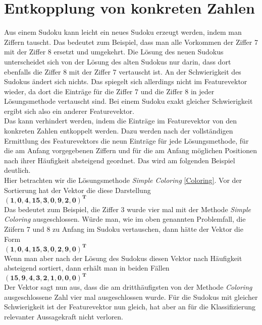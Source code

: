 \newpage
\section{Entkopplung von konkreten Zahlen}
\label{Entkopplung}
Aus einem Sudoku kann leicht ein neues Sudoku erzeugt werden, indem man Ziffern tauscht. Das bedeutet zum Beispiel, dass man alle Vorkommen der Ziffer 7 mit der Ziffer 8 ersetzt und umgekehrt. Die Lösung des neuen Sudokus unterscheidet sich von der Lösung des alten Sudokus nur darin, dass dort ebenfalls die Ziffer 8 mit der Ziffer 7 vertauscht ist. An der Schwierigkeit des Sudokus ändert sich nichts. Das spiegelt sich allerdings nicht im Featurevektor wieder, da dort die Einträge für die Ziffer 7 und die Ziffer 8 in jeder Lösungsmethode vertauscht sind. Bei einem Sudoku exakt gleicher Schwierigkeit ergibt sich also ein anderer Featurevektor.\\
Das kann verhindert werden, indem die Einträge im Featurevektor von den konkreten Zahlen entkoppelt werden. Dazu werden nach der vollständigen Ermittlung des Featurevektors die neun Einträge für jede Lösungsmethode, für die am Anfang vorgegebenen Ziffern und für die am Anfang möglichen Positionen nach ihrer Häufigkeit absteigend geordnet. Das wird am folgenden Beispiel deutlich.\\
Hier betrachten wir die Lösungsmethode \textit{Simple Coloring} \ref{Coloring}. Vor der Sortierung hat der Vektor die diese Darstellung \\
$\mathbf{(1, 0, 4, 15, 3, 0, 9, 2, 0)^{T}}$\\
Das bedeutet zum Beispiel, die Ziffer 3 wurde vier mal mit der Methode \textit{Simple Coloring} ausgeschlossen. Würde man, wie im oben genannten Problemfall, die Ziifern 7 und 8 zu Anfang im Sudoku vertauschen, dann hätte der Vektor die Form\\
$\mathbf{(1, 0, 4, 15, 3, 0, 2, 9, 0)^{T}}$\\
Wenn man aber nach der Lösung des Sudokus diesen Vektor nach Häufigkeit absteigend sortiert, dann erhält man in beiden Fällen\\
$\mathbf{(15, 9, 4, 3, 2, 1, 0, 0, 0)^{T}}$\\
Der Vektor sagt nun aus, dass die am dritthäufigsten von der Methode \textit{Coloring} ausgeschlossene Zahl vier mal ausgeschlossen wurde. Für die Sudokus mit gleicher Schwierigkeit ist der Featurevektor nun gleich, hat aber an für die Klassifizierung relevanter Aussagekraft nicht verloren.